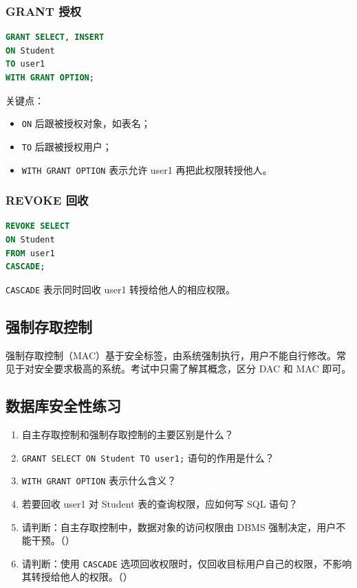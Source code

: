 \documentclass{../../note}
\begin{document}
\subsubsection{GRANT 授权}

\begin{lstlisting}[language=SQL]
GRANT SELECT, INSERT
ON Student
TO user1
WITH GRANT OPTION;
\end{lstlisting}

关键点：

\begin{itemize}
  \item \texttt{ON} 后跟被授权对象，如表名；
  \item \texttt{TO} 后跟被授权用户；
  \item \texttt{WITH GRANT OPTION} 表示允许 user1 再把此权限转授他人。
\end{itemize}

\subsubsection{REVOKE 回收}

\begin{lstlisting}[language=SQL]
REVOKE SELECT
ON Student
FROM user1
CASCADE;
\end{lstlisting}

\texttt{CASCADE} 表示同时回收 user1 转授给他人的相应权限。

\subsection{强制存取控制}

强制存取控制（MAC）基于安全标签，由系统强制执行，用户不能自行修改。常见于对安全要求极高的系统。考试中只需了解其概念，区分 DAC 和 MAC 即可。

\subsection{数据库安全性练习}

\begin{enumerate}
  \item 自主存取控制和强制存取控制的主要区别是什么？
  \item \texttt{GRANT SELECT ON Student TO user1;} 语句的作用是什么？
  \item \texttt{WITH GRANT OPTION} 表示什么含义？
  \item 若要回收 user1 对 Student 表的查询权限，应如何写 SQL 语句？
  \item 请判断：自主存取控制中，数据对象的访问权限由 DBMS 强制决定，用户不能干预。（\hspace{1cm}）
  \item 请判断：使用 \texttt{CASCADE} 选项回收权限时，仅回收目标用户自己的权限，不影响其转授给他人的权限。（\hspace{1cm}）
\end{enumerate}
\end{document}
